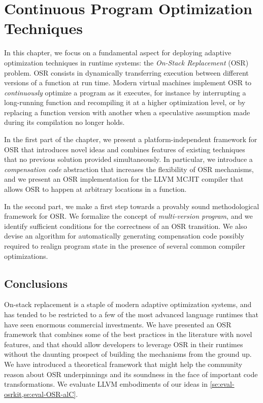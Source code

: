 
\chapter{Continuous Program Optimization Techniques}
\label{ch:continuous}

In this chapter, we focus on a fundamental aspect for deploying adaptive optimization techniques in runtime systems: the {\em On-Stack Replacement} (OSR) problem. OSR consists in dynamically transferring execution between different versions of a function at run time. Modern virtual machines implement OSR to {\em continuously} optimize a program as it executes, for instance by interrupting a long-running function and recompiling it at a higher optimization level, or by replacing a function version with another when a speculative assumption made during its compilation no longer holds.

In the first part of the chapter, we present a platform-independent framework for OSR that introduces novel ideas and combines features of existing techniques that no previous solution provided simultaneously. In particular, we introduce a {\em compensation code} abstraction that increases the flexibility of OSR mechanisms, and we present an OSR implementation for the LLVM MCJIT compiler that allows OSR to happen at arbitrary locations in a function.

In the second part, we make a first step towards a provably sound methodological framework for OSR. We formalize the concept of {\em multi-version program}, and we identify sufficient conditions for the correctness of an OSR transition. We also devise an algorithm for automatically generating compensation code possibly required to realign program state in the presence of several common compiler optimizations.




\section{Conclusions}
On-stack replacement is a staple of modern adaptive optimization systems, and has tended to be restricted to a few of the most advanced language runtimes that have seen enormous commercial investments. We have presented an OSR framework that combines some of the best practices in the literature with novel features, and that should allow developers to leverage OSR in their runtimes without the daunting prospect of building the mechanisms from the ground up. We have introduced a theoretical framework that might help the community reason about OSR underpinnings and its soundness in the face of important code transformations. We evaluate LLVM embodiments of our ideas in \mysection\ref{se:eval-osrkit,se:eval-OSR-alC}.

